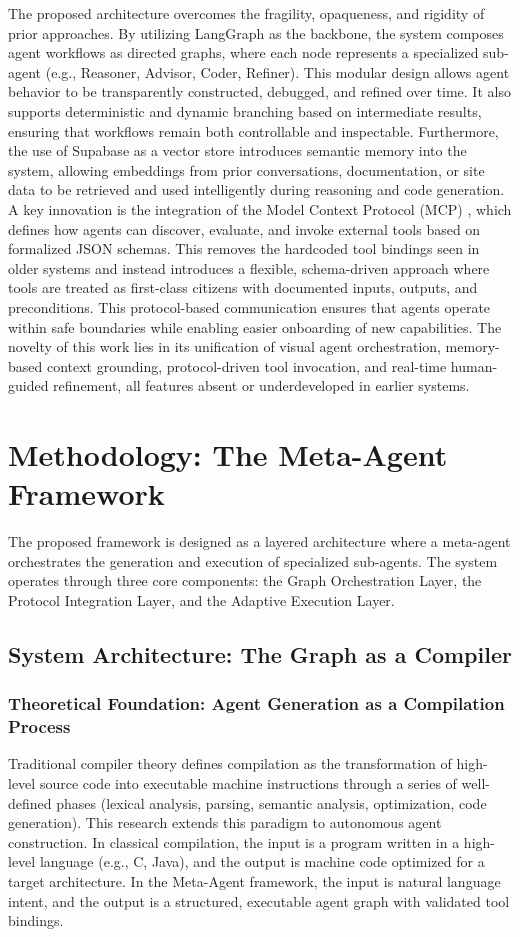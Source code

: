 \documentclass[lettersize,journal]{IEEEtran}
\begin{document}
The proposed architecture overcomes the fragility, opaqueness, and rigidity of prior approaches. By utilizing LangGraph as the backbone, the system composes agent workflows as directed graphs, where each node represents a specialized sub-agent (e.g., Reasoner, Advisor, Coder, Refiner). This modular design allows agent behavior to be transparently constructed, debugged, and refined over time. It also supports deterministic and dynamic branching based on intermediate results, ensuring that workflows remain both controllable and inspectable. Furthermore, the use of Supabase as a vector store introduces semantic memory into the system, allowing embeddings from prior conversations, documentation, or site data to be retrieved and used intelligently during reasoning and code generation. A key innovation is the integration of the Model Context Protocol (MCP) \cite{krishnan2025advancing}, which defines how agents can discover, evaluate, and invoke external tools based on formalized JSON schemas. This removes the hardcoded tool bindings seen in older systems and instead introduces a flexible, schema-driven approach where tools are treated as first-class citizens with documented inputs, outputs, and preconditions. This protocol-based communication ensures that agents operate within safe boundaries while enabling easier onboarding of new capabilities. The novelty of this work lies in its unification of visual agent orchestration, memory-based context grounding, protocol-driven tool invocation, and real-time human-guided refinement, all features absent or underdeveloped in earlier systems.

\section{Methodology: The Meta-Agent Framework}

The proposed framework is designed as a layered architecture where a meta-agent orchestrates the generation and execution of specialized sub-agents. The system operates through three core components: the Graph Orchestration Layer, the Protocol Integration Layer, and the Adaptive Execution Layer.

\subsection{System Architecture: The Graph as a Compiler}
\subsubsection{Theoretical Foundation: Agent Generation as a Compilation Process}
Traditional compiler theory defines compilation as the transformation of high-level source code into executable machine instructions through a series of well-defined phases (lexical analysis, parsing, semantic analysis, optimization, code generation). This research extends this paradigm to autonomous agent construction. In classical compilation, the input is a program written in a high-level language (e.g., C, Java), and the output is machine code optimized for a target architecture. In the Meta-Agent framework, the input is natural language intent, and the output is a structured, executable agent graph with validated tool bindings.
\end{document}
